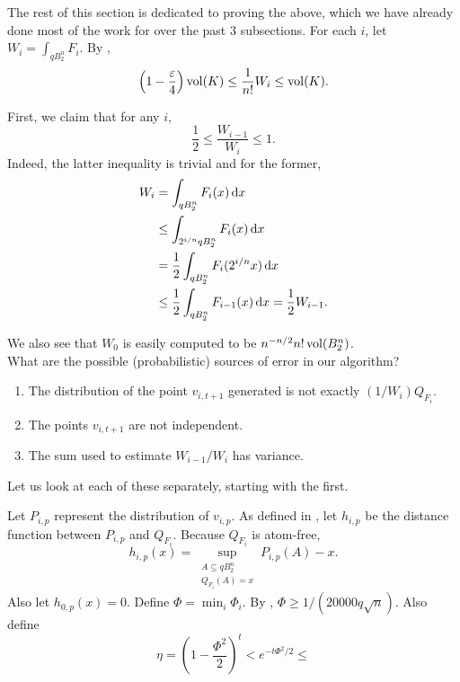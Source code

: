The rest of this section is dedicated to proving the above, which we have already done most of the work for over the past 3 subsections. For each $i$, let $W_i = \int_{qB_2^n} F_i$. By , 
\[ \left(1-\frac{\varepsilon}{4}\right) \operatorname{vol}(K) \leq \frac{1}{n!}W_i \leq \operatorname{vol}(K). \]

First, we claim that for any $i$,
\[ \frac{1}{2} \leq \frac{W_{i-1}}{W_i} \leq 1. \]
Indeed, the latter inequality is trivial and for the former,
\begin{align*}
	W_i &= \int_{qB_2^n} F_i(x)\operatorname{d}\!{x} \\
		&\leq \int_{2^{i/n}qB_2^n} F_i(x)\operatorname{d}\!{x} \\
		&= \frac{1}{2} \int_{qB_2^n} F_i(2^{i/n}x)\operatorname{d}\!{x} \\
		&\leq \frac{1}{2} \int_{qB_2^n} F_{i-1}(x)\operatorname{d}\!{x} = \frac{1}{2} W_{i-1}.
\end{align*}

We also see that $W_0$ is easily computed to be $n^{-n/2}n!\operatorname{vol}(B_2^n)$.\\

What are the possible (probabilistic) sources of error in our algorithm?
\begin{enumerate}
	\item The distribution of the point $v_{i,t+1}$ generated is not exactly $(1/W_i)Q_{F_i}$.
	\item The points $v_{i,t+1}$ are not independent.
	\item The sum used to estimate $W_{i-1}/W_i$ has variance.
\end{enumerate}

Let us look at each of these separately, starting with the first.

Let $P_{i,p}$ represent the distribution of $v_{i,p}$. As defined in , let $h_{i,p}$ be the distance function between $P_{i,p}$ and $Q_{F_i}$. Because $Q_{F_i}$ is atom-free,
\[ h_{i,p}(x) = \sup_{\substack{A\subseteq qB_2^n \\ Q_{F_i}(A) = x}} P_{i,p}(A) - x. \]
Also let $h_{0,p}(x)=0$. Define $\Phi=\min_i\Phi_i$. By , $\Phi \geq 1/(20000q\sqrt{n})$. Also define
\[ \eta = \left(1-\frac{\Phi^2}{2}\right)^t < e^{-t\Phi^2/2} \leq  \]

